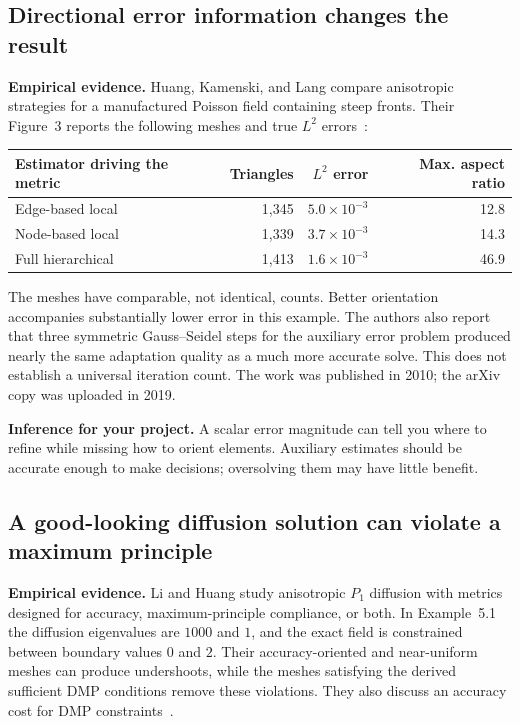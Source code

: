 \documentclass[11pt,a4paper]{article}
\newcommand{\evidence}{\textcolor{accent}{\textbf{Empirical evidence.}} }
\begin{document}
\subsection{Directional error information changes the result}
\evidence Huang, Kamenski, and Lang compare anisotropic strategies for a manufactured Poisson field containing steep fronts. Their Figure~3 reports the following meshes and true $L^2$ errors~\cite{huangkamenski}:
\begin{center}
\begin{tabular}{lrrr}
\toprule
Estimator driving the metric & Triangles & $L^2$ error & Max. aspect ratio\\
\midrule
Edge-based local & 1,345 & $5.0\times10^{-3}$ & 12.8\\
Node-based local & 1,339 & $3.7\times10^{-3}$ & 14.3\\
Full hierarchical & 1,413 & $1.6\times10^{-3}$ & 46.9\\
\bottomrule
\end{tabular}
\end{center}
The meshes have comparable, not identical, counts. Better orientation accompanies substantially lower error in this example. The authors also report that three symmetric Gauss--Seidel steps for the auxiliary error problem produced nearly the same adaptation quality as a much more accurate solve. This does not establish a universal iteration count. The work was published in 2010; the arXiv copy was uploaded in 2019.

\textbf{Inference for your project.} A scalar error magnitude can tell you where to refine while missing how to orient elements. Auxiliary estimates should be accurate enough to make decisions; oversolving them may have little benefit.

\subsection{A good-looking diffusion solution can violate a maximum principle}
\evidence Li and Huang study anisotropic $P_1$ diffusion with metrics designed for accuracy, maximum-principle compliance, or both. In Example~5.1 the diffusion eigenvalues are $1000$ and $1$, and the exact field is constrained between boundary values $0$ and $2$. Their accuracy-oriented and near-uniform meshes can produce undershoots, while the meshes satisfying the derived sufficient DMP conditions remove these violations. They also discuss an accuracy cost for DMP constraints~\cite{lihuang}.
\end{document}
